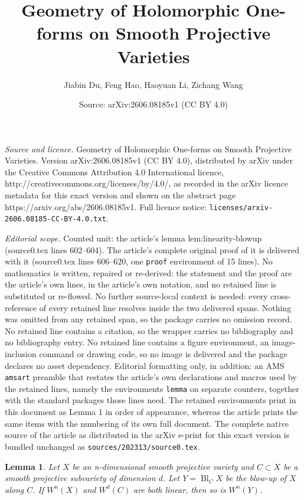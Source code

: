 \documentclass[10pt,a4paper]{amsart}
\title{Geometry of Holomorphic One-forms on Smooth Projective Varieties}
\author{Jiabin Du, Feng Hao, Haoyuan Li, Zichang Wang}
\date{Source: arXiv:2606.08185v1 (CC BY 4.0)}
\newtheorem{lemma}{Lemma}
\DeclareMathOperator{\Bl}{Bl}
\begin{document}
\maketitle

\noindent\emph{Source and licence.} Geometry of Holomorphic One-forms on Smooth Projective Varieties. Version arXiv:2606.08185v1 (CC BY 4.0), distributed by arXiv under the Creative Commons Attribution 4.0 International licence, http://creativecommons.org/licenses/by/4.0/, as recorded in the arXiv licence metadata for this exact version and shown on the abstract page https://arxiv.org/abs/2606.08185v1. Full licence notice: \texttt{licenses/arxiv-2606.08185-CC-BY-4.0.txt}.\par\smallskip

\noindent\textit{Editorial scope.} Counted unit: the article's lemma lem:linearity-blowup (source0.tex lines 602--604). The article's complete original proof of it is delivered with it (source0.tex lines 606--620, one \texttt{proof} environment of 15 lines). No mathematics is written, repaired or re-derived: the statement and the proof are the article's own lines, in the article's own notation, and no retained line is substituted or re-flowed.  No further source-local context is needed: every cross-reference of every retained line resolves inside the two delivered spans.  Nothing was omitted from any retained span, so the package carries no omission record.  No retained line contains a citation, so the wrapper carries no bibliography and no bibliography entry.  No retained line contains a figure environment, an image-inclusion command or drawing code, so no image is delivered and the package declares no asset dependency.  Editorial formatting only, in addition: an AMS \texttt{amsart} preamble that restates the article's own declarations and macros used by the retained lines, namely the environments \texttt{lemma} on separate counters, together with the standard packages those lines need.  The retained environments print in this document as Lemma 1 in order of appearance, whereas the article prints the same items with the numbering of its own full document.  The complete native source of the article as distributed in the arXiv e-print for this exact version is bundled unchanged as \texttt{sources/202313/source0.tex}.
\begin{lemma}\label{lem:linearity-blowup}
    Let $X$ be an n-dimensional smooth projective variety and $C\subset X$ be a smooth projective subvariety of dimension $d$. Let $Y=\Bl_{C}X$ be the blow-up of $X$ along $C$. If $W^n(X)$ and $W^d(C)$ are both linear, then so is $W^n(Y)$.
\end{lemma}
\end{document}
